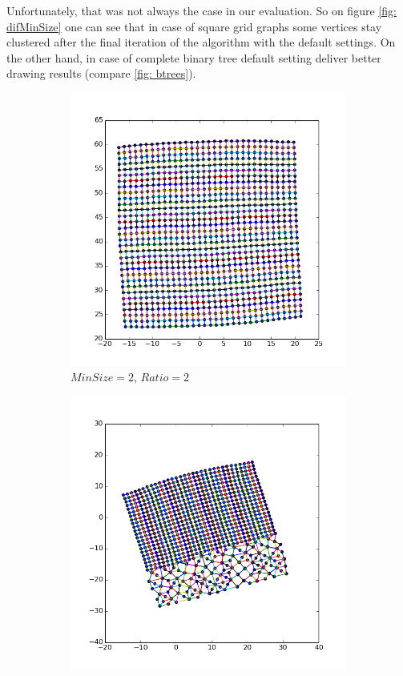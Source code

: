 \documentclass[12pt,a4paper]{article}
\begin{document}
Unfortunately, that was not always the case in our evaluation. So on figure \ref{fig: difMinSize} one can see that in case of square grid graphs some vertices stay clustered after the final iteration of the algorithm with the default settings. On the other hand, in case of complete binary tree default setting deliver better drawing results (compare \ref{fig: btrees}).

\begin{figure}[htb]
	 \begin{subfigure}{0.5\textwidth}
		   \centering
           \includegraphics[scale=0.45]{results_Harel/HK_grid32x32_m2r2.png}
           \caption{$MinSize=2$, $Ratio=2$}
     \end{subfigure}
	 \begin{subfigure}{0.5\textwidth}
			\centering
           \includegraphics[scale=0.45]{results_Harel/HK_grid32x32_m10_r3.png}

\end{subfigure}
\end{figure}
\end{document}
